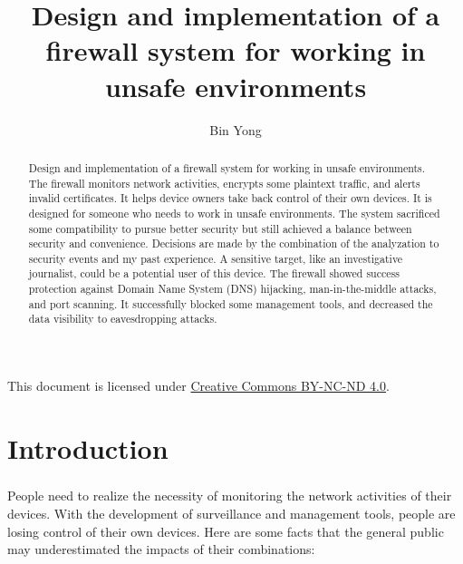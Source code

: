 \documentclass[mscthesis]{usiinfthesis}
\title{Design and implementation of a firewall system for working in unsafe environments} %
\author{Bin Yong} %
\begin{document}

\maketitle %

\frontmatter %

\begin{abstract}
  \paragraph{}
  Design and implementation of a firewall system for working in unsafe environments. The firewall monitors network activities, encrypts some plaintext traffic, and alerts invalid certificates. It helps device owners take back control of their own devices. It is designed for someone who needs to work in unsafe environments. The system sacrificed some compatibility to pursue better security but still achieved a balance between security and convenience. Decisions are made by the combination of the analyzation to security events and my past experience. A sensitive target, like an investigative journalist, could be a potential user of this device. The firewall showed success protection against Domain Name System (DNS) hijacking, man-in-the-middle attacks, and port scanning. It successfully blocked some management tools, and decreased the data visibility to eavesdropping attacks.
\end{abstract}

\begin{acknowledgements}
  \paragraph{}
  This document is licensed under \href{https://creativecommons.org/licenses/by-nc-nd/4.0/}{Creative Commons BY-NC-ND 4.0}.
\end{acknowledgements}

\tableofcontents
\listoffigures %
\listoftables %

\mainmatter

\chapter{Introduction}
\paragraph{}
People need to realize the necessity of monitoring the network activities of their devices. With the development of surveillance and management tools, people are losing control of their own devices. Here are some facts that the general public may underestimated the impacts of their combinations:
\end{document}
